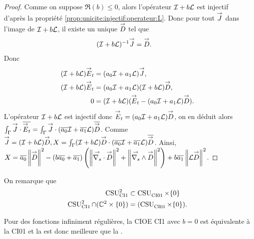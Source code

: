     \begin{proof}
      Comme on suppose \(\Re(b)\le 0\), alors l'opérateur \(\oI + b\LL\) est injectif d'après la propriété \ref{prop:unicite:injectif:operateur:L}. Donc pour tout \(\vJ\) dans l'image de \(\oI + b\LL\), il existe un unique \(\vect{D}\) tel que
      \begin{align*}
        (\oI + b \LL)^{-1}\vJ &= \vect{D}.
      \end{align*}
      Donc 
      \begin{align*}
        (\oI + b \LL)\vE_t &= (a_0\oI + a_1\LL)\vJ,
        \\
        (\oI + b \LL)\vE_t &= (a_0\oI + a_1\LL)(\oI + b \LL)\vect{D},
        \\
        0 &= (\oI + b \LL)(\vE_t -  (a_0\oI + a_1\LL)\vect{D}).
      \end{align*}
      L'opérateur \(\oI + b \LL\) est injectif donc \(\vE_t = (a_0\oI + a_1\LL)\vect{D}\), on en déduit alors \(\int_\Gamma \vJ \cdot \conj{\vE_t} = \int_\Gamma \vJ \cdot (\conj{a_0}\oI + \conj{a_1}\LL)\conj{\vect{D}}\).
      Comme \(\vJ = (\oI + b \LL)\vect{D}, X = \int_\Gamma (\oI + b \LL)\vect{D} \cdot (\conj{a_0}\oI + \conj{a_1}\LL)\conj{\vect{D}}\).
      Ainsi, \( X = \conj{a_0}\norm{\vect{D}}^2 - (b\conj{a_0}+\conj{a_1})\left(\norm{\vdivs{\vect{D}}}^2+\norm{\vrots{\vect{D}}}^2\right) + b\conj{a_1} \norm{\LL\vect{D}}^2\).
    \end{proof}

    On remarque que
    \begin{align}
      \CSU[2]{CI1} & \subset \CSU{CI01}\times\lbrace0\rbrace
      \\
      \CSU[2]{CI1}\cap(\CC^2 \times \lbrace0\rbrace) &= (\CSU{CI01}\times\lbrace0\rbrace).
    \end{align}

    Pour des fonctions infiniment régulières, la CIOE CI1 avec \(b=0\) est équivalente à la CI01 et la  est donc meilleure que la  .
